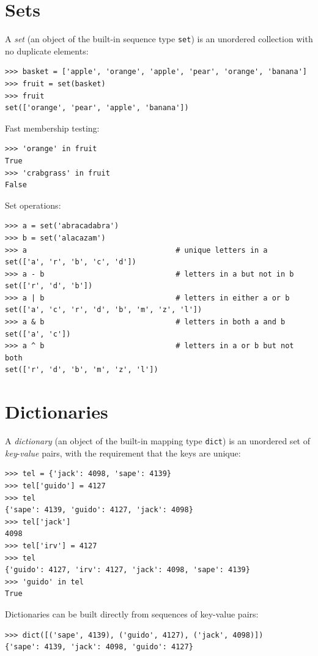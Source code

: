 \documentclass[8pt,a4paper,compress,handout]{beamer}
\begin{document}
\section{Sets}
\begin{frame}[fragile]
A \emph{set} (an object of the built-in sequence type \lstinline{set}) is an unordered collection with no duplicate elements: 
\begin{lstlisting}[language={}]
>>> basket = ['apple', 'orange', 'apple', 'pear', 'orange', 'banana']
>>> fruit = set(basket)
>>> fruit
set(['orange', 'pear', 'apple', 'banana'])
\end{lstlisting}

\bigskip

Fast membership testing:
\begin{lstlisting}[language={}]
>>> 'orange' in fruit
True
>>> 'crabgrass' in fruit
False
\end{lstlisting}

\bigskip

Set operations:
\begin{lstlisting}[language={}]
>>> a = set('abracadabra')
>>> b = set('alacazam')
>>> a                                  # unique letters in a
set(['a', 'r', 'b', 'c', 'd'])
>>> a - b                              # letters in a but not in b
set(['r', 'd', 'b'])
>>> a | b                              # letters in either a or b
set(['a', 'c', 'r', 'd', 'b', 'm', 'z', 'l'])
>>> a & b                              # letters in both a and b
set(['a', 'c'])
>>> a ^ b                              # letters in a or b but not both
set(['r', 'd', 'b', 'm', 'z', 'l'])
\end{lstlisting}

\end{frame}

\section{Dictionaries}
\begin{frame}[fragile]
A \emph{dictionary} (an object of the built-in mapping type \lstinline{dict}) is an unordered set of \emph{key}-\emph{value} pairs, with the requirement that the keys are unique:
\begin{lstlisting}[language={}]
>>> tel = {'jack': 4098, 'sape': 4139}
>>> tel['guido'] = 4127
>>> tel
{'sape': 4139, 'guido': 4127, 'jack': 4098}
>>> tel['jack']
4098
>>> tel['irv'] = 4127
>>> tel
{'guido': 4127, 'irv': 4127, 'jack': 4098, 'sape': 4139}
>>> 'guido' in tel
True
\end{lstlisting}

\bigskip

Dictionaries can be built directly from sequences of key-value pairs:
\begin{lstlisting}[language={}]
>>> dict([('sape', 4139), ('guido', 4127), ('jack', 4098)])
{'sape': 4139, 'jack': 4098, 'guido': 4127}
\end{lstlisting}

\end{frame}
\end{document}
